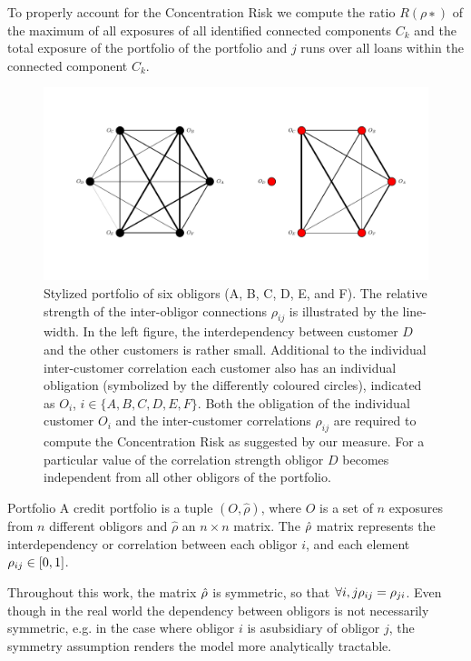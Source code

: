 To properly account for the Concentration Risk we compute the ratio $R(ρ∗)$ of the maximum of all exposures of all identified connected components $C_k$ and the total exposure of the portfolio
of the portfolio and $j$ runs over all loans within the connected component $C_k$.
\begin{figure}[tb]
	\centering
	\includegraphics[scale=0.5]{figures/ramping_parameter_example.png}
	\caption{
Stylized portfolio of six obligors (A, B, C, D, E, and F).
The relative strength of the inter-obligor connections $\rho_{ij}$ is illustrated by the line-width.
In the left figure, the interdependency between customer $D$ and the other customers is rather small.
Additional to the individual inter-customer correlation each customer also has an individual obligation (symbolized by the differently coloured circles), indicated as $O_i$, $i \in \{A, B, C, D, E, F \}$.
Both the obligation of the individual customer $O_i$ and the inter-customer correlations $\rho_{ij}$ are required to compute the Concentration Risk as suggested by our measure.
For a particular value of the correlation strength obligor $D$ becomes independent from all other obligors of the portfolio.
	}
	\label{fig:6_pf_ramping}
\end{figure}

 
 
 
\begin{definition}{Portfolio}
A credit portfolio is a tuple $(O, \hat{\rho})$, where $O$ is a set of $n$ exposures from $n$ different obligors and $\hat{\rho}$ an $n \times n$ matrix.
The $\hat{\rho}$ matrix represents the interdependency or correlation between each obligor $i$, and each element $\rho_{ij} \in [0,1]$.
\end{definition}

\begin{remark}
Throughout this work, the matrix $\hat{\rho}$ is symmetric, so that $\forall i,j \rho_{ij} = \rho_{ji}$.
Even though in the real world the dependency between obligors is not necessarily symmetric, e.g. in the case where obligor $i$ is asubsidiary of obligor $j$, the symmetry assumption renders the model more analytically tractable.
\end{remark}





